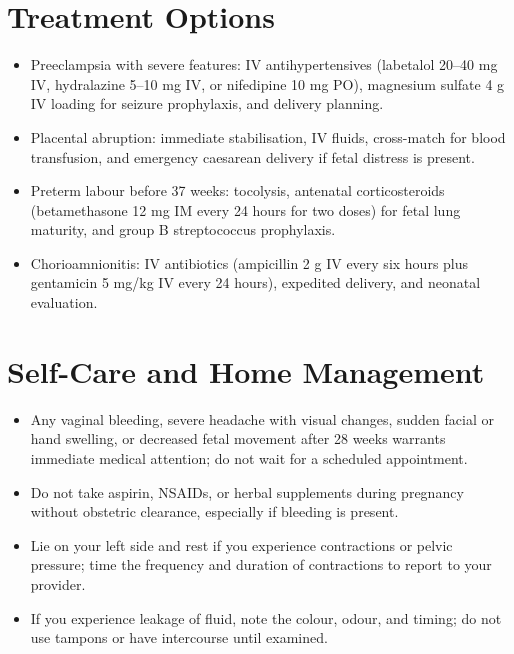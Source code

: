 \section*{Treatment Options}
\begin{itemize}
  \item Preeclampsia with severe features: IV antihypertensives (labetalol 20--40 mg IV, hydralazine 5--10 mg IV, or nifedipine 10 mg PO), magnesium sulfate 4 g IV loading for seizure prophylaxis, and delivery planning.
  \item Placental abruption: immediate stabilisation, IV fluids, cross-match for blood transfusion, and emergency caesarean delivery if fetal distress is present.
  \item Preterm labour before 37 weeks: tocolysis, antenatal corticosteroids (betamethasone 12 mg IM every 24 hours for two doses) for fetal lung maturity, and group B streptococcus prophylaxis.
  \item Chorioamnionitis: IV antibiotics (ampicillin 2 g IV every six hours plus gentamicin 5 mg/kg IV every 24 hours), expedited delivery, and neonatal evaluation.
\end{itemize}

\section*{Self-Care and Home Management}
\begin{itemize}
  \item Any vaginal bleeding, severe headache with visual changes, sudden facial or hand swelling, or decreased fetal movement after 28 weeks warrants immediate medical attention; do not wait for a scheduled appointment.
  \item Do not take aspirin, NSAIDs, or herbal supplements during pregnancy without obstetric clearance, especially if bleeding is present.
  \item Lie on your left side and rest if you experience contractions or pelvic pressure; time the frequency and duration of contractions to report to your provider.
  \item If you experience leakage of fluid, note the colour, odour, and timing; do not use tampons or have intercourse until examined.
\end{itemize}

